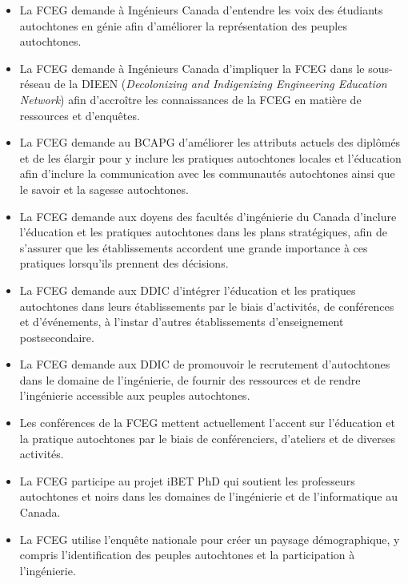 \begin{itemize}
 \item La FCEG demande à Ingénieurs Canada d'entendre les voix des étudiants autochtones en génie afin d'améliorer la représentation des peuples autochtones.
 \item La FCEG demande à Ingénieurs Canada d'impliquer la FCEG dans le sous-réseau de la DIEEN (\textit{Decolonizing and Indigenizing Engineering Education Network}) afin d'accroître les connaissances de la FCEG en matière de ressources et d'enquêtes.
 \item La FCEG demande au BCAPG d'améliorer les attributs actuels des diplômés et de les élargir pour y inclure les pratiques autochtones locales et l'éducation afin d'inclure la communication avec les communautés autochtones ainsi que le savoir et la sagesse autochtones.
 \item La FCEG demande aux doyens des facultés d'ingénierie du Canada d'inclure l'éducation et les pratiques autochtones dans les plans stratégiques, afin de s'assurer que les établissements accordent une grande importance à ces pratiques lorsqu'ils prennent des décisions.
 \item La FCEG demande aux DDIC d'intégrer l'éducation et les pratiques autochtones dans leurs établissements par le biais d'activités, de conférences et d'événements, à l'instar d'autres établissements d'enseignement postsecondaire.
 \item La FCEG demande aux DDIC de promouvoir le recrutement d'autochtones dans le domaine de l'ingénierie, de fournir des ressources et de rendre l'ingénierie accessible aux peuples autochtones.
\end{itemize}

\begin{itemize}
 \item Les conférences de la FCEG mettent actuellement l'accent sur l'éducation et la pratique autochtones par le biais de conférenciers, d'ateliers et de diverses activités.
 \item La FCEG participe au projet iBET PhD qui soutient les professeurs autochtones et noirs dans les domaines de l'ingénierie et de l'informatique au Canada.
 \item La FCEG utilise l'enquête nationale pour créer un paysage démographique, y compris l'identification des peuples autochtones et la participation à l'ingénierie.
\end{itemize}

